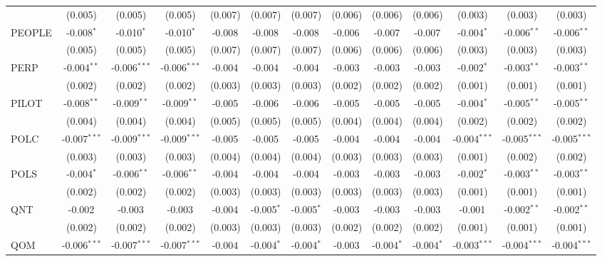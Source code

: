 \begin{table}[!htbp]
\begin{tabular}{@{\extracolsep{5pt}}lcccccccccccc}
  & (0.005) & (0.005) & (0.005) & (0.007) & (0.007) & (0.007) & (0.006) & (0.006) & (0.006) & (0.003) & (0.003) & (0.003) \\
 PEOPLE & -0.008$^{*}$ & -0.010$^{*}$ & -0.010$^{*}$ & -0.008$^{}$ & -0.008$^{}$ & -0.008$^{}$ & -0.006$^{}$ & -0.007$^{}$ & -0.007$^{}$ & -0.004$^{*}$ & -0.006$^{**}$ & -0.006$^{**}$ \\
  & (0.005) & (0.005) & (0.005) & (0.007) & (0.007) & (0.007) & (0.006) & (0.006) & (0.006) & (0.003) & (0.003) & (0.003) \\
 PERP & -0.004$^{**}$ & -0.006$^{***}$ & -0.006$^{***}$ & -0.004$^{}$ & -0.004$^{}$ & -0.004$^{}$ & -0.003$^{}$ & -0.003$^{}$ & -0.003$^{}$ & -0.002$^{*}$ & -0.003$^{**}$ & -0.003$^{**}$ \\
  & (0.002) & (0.002) & (0.002) & (0.003) & (0.003) & (0.003) & (0.002) & (0.002) & (0.002) & (0.001) & (0.001) & (0.001) \\
 PILOT & -0.008$^{**}$ & -0.009$^{**}$ & -0.009$^{**}$ & -0.005$^{}$ & -0.006$^{}$ & -0.006$^{}$ & -0.005$^{}$ & -0.005$^{}$ & -0.005$^{}$ & -0.004$^{*}$ & -0.005$^{**}$ & -0.005$^{**}$ \\
  & (0.004) & (0.004) & (0.004) & (0.005) & (0.005) & (0.005) & (0.004) & (0.004) & (0.004) & (0.002) & (0.002) & (0.002) \\
 POLC & -0.007$^{***}$ & -0.009$^{***}$ & -0.009$^{***}$ & -0.005$^{}$ & -0.005$^{}$ & -0.005$^{}$ & -0.004$^{}$ & -0.004$^{}$ & -0.004$^{}$ & -0.004$^{***}$ & -0.005$^{***}$ & -0.005$^{***}$ \\
  & (0.003) & (0.003) & (0.003) & (0.004) & (0.004) & (0.004) & (0.003) & (0.003) & (0.003) & (0.001) & (0.002) & (0.002) \\
 POLS & -0.004$^{*}$ & -0.006$^{**}$ & -0.006$^{**}$ & -0.004$^{}$ & -0.004$^{}$ & -0.004$^{}$ & -0.003$^{}$ & -0.003$^{}$ & -0.003$^{}$ & -0.002$^{*}$ & -0.003$^{**}$ & -0.003$^{**}$ \\
  & (0.002) & (0.002) & (0.002) & (0.003) & (0.003) & (0.003) & (0.003) & (0.003) & (0.003) & (0.001) & (0.001) & (0.001) \\
 QNT & -0.002$^{}$ & -0.003$^{}$ & -0.003$^{}$ & -0.004$^{}$ & -0.005$^{*}$ & -0.005$^{*}$ & -0.003$^{}$ & -0.003$^{}$ & -0.003$^{}$ & -0.001$^{}$ & -0.002$^{**}$ & -0.002$^{**}$ \\
  & (0.002) & (0.002) & (0.002) & (0.003) & (0.003) & (0.003) & (0.002) & (0.002) & (0.002) & (0.001) & (0.001) & (0.001) \\
 QOM & -0.006$^{***}$ & -0.007$^{***}$ & -0.007$^{***}$ & -0.004$^{}$ & -0.004$^{*}$ & -0.004$^{*}$ & -0.003$^{}$ & -0.004$^{*}$ & -0.004$^{*}$ & -0.003$^{***}$ & -0.004$^{***}$ & -0.004$^{***}$ \\

\end{tabular}
\end{table}
